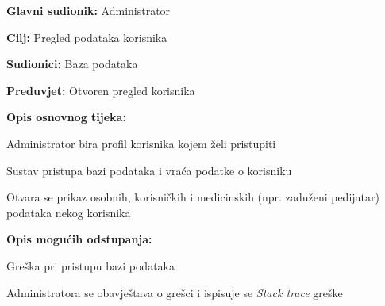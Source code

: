 					\noindent {}
					\begin{packed_item}
						
						\item \textbf{Glavni sudionik: }Administrator
						\item  \textbf{Cilj:} Pregled podataka korisnika
						\item  \textbf{Sudionici:} Baza podataka
						\item  \textbf{Preduvjet:} Otvoren pregled korisnika
						\item  \textbf{Opis osnovnog tijeka:}
						
						\item[] \begin{packed_enum}
							\item Administrator bira profil korisnika kojem želi pristupiti
							\item Sustav pristupa bazi podataka i vraća podatke o korisniku
							\item Otvara se prikaz osobnih, korisničkih i medicinskih (npr. zaduženi pedijatar) podataka nekog korisnika
						\end{packed_enum}
						\item \textbf{Opis mogućih odstupanja:}
						\item[] \begin{packed_item}
							
							\item[2.a] Greška pri pristupu bazi podataka
							\item[] \begin{packed_enum}
								
								\item Administratora se obavještava o grešci i ispisuje se \textit{Stack trace} greške
								
							\end{packed_enum}
						\end{packed_item}
					\end{packed_item}
					
